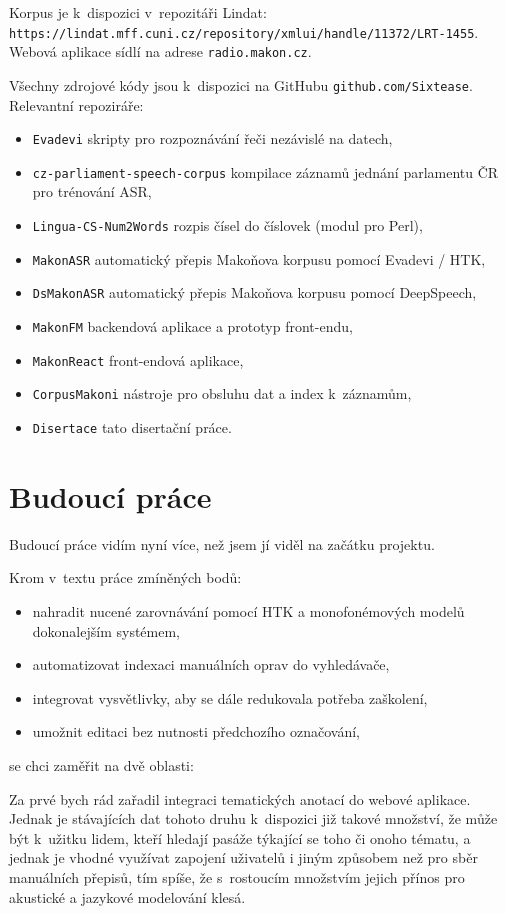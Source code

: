 Korpus je k~dispozici v~repozitáři Lindat:\\
\texttt{https://lindat.mff.cuni.cz/repository/xmlui/handle/11372/LRT-1455}.\\
Webová aplikace sídlí na adrese \texttt{radio.makon.cz}.

Všechny zdrojové kódy jsou k~dispozici na GitHubu \texttt{github.com/Sixtease}.
Relevantní repoziráře:
\begin{itemize}
\item{\texttt{Evadevi} skripty pro rozpoznávání řeči nezávislé na datech,}
\item{\texttt{cz-parliament-speech-corpus}
    kompilace záznamů jednání parlamentu ČR pro trénování ASR,
}
\item{\texttt{Lingua-CS-Num2Words} rozpis čísel do číslovek (modul pro Perl),}
\item{\texttt{MakonASR} automatický přepis Makoňova korpusu pomocí Evadevi / HTK,}
\item{\texttt{DsMakonASR} automatický přepis Makoňova korpusu pomocí DeepSpeech,}
\item{\texttt{MakonFM} backendová aplikace a prototyp front-endu,}
\item{\texttt{MakonReact} front-endová aplikace,}
\item{\texttt{CorpusMakoni} nástroje pro obsluhu dat a index k~záznamům,}
\item{\texttt{Disertace} tato disertační práce.}
\end{itemize}

\section{Budoucí práce}

Budoucí práce vidím nyní více, než jsem jí viděl na začátku projektu.

Krom v~textu práce zmíněných bodů:
\begin{itemize}
\item{nahradit nucené zarovnávání pomocí HTK a monofonémových modelů
dokonalejším systémem,}
\item{automatizovat indexaci manuálních oprav do vyhledávače,}
\item{integrovat vysvětlivky, aby se dále redukovala potřeba zaškolení,}
\item{umožnit editaci bez nutnosti předchozího označování,}
\end{itemize}
se chci zaměřit na dvě oblasti:

Za prvé bych rád zařadil integraci tematických anotací do
webové aplikace. Jednak je stávajících dat tohoto druhu k~dispozici již takové
množství, že může být k~užitku lidem, kteří hledají pasáže týkající se toho či
onoho tématu, a jednak je vhodné využívat zapojení uživatelů i jiným způsobem
než pro sběr manuálních přepisů, tím spíše, že s~rostoucím množstvím jejich
přínos pro akustické a jazykové modelování klesá.


